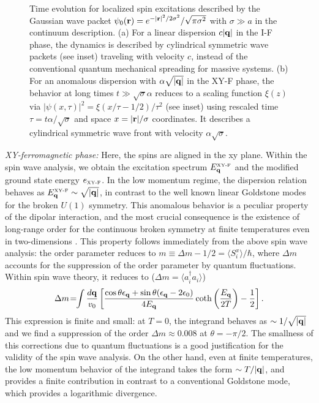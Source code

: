 \begin{figure}[ht]
  \caption{ Time evolution for localized spin excitations described by the Gaussian wave packet $\psi_{0}({\bf r}) = e^{- |{\bf r}|^2/2\sigma^2}/\sqrt{\pi \sigma^2}$
  with $\sigma \gg a$ in the continuum description. (a) For a linear dispersion $c|{\bf q}|$ in the I-F phase, the dynamics is described by cylindrical symmetric wave packets (see inset) traveling
  with velocity $c$, instead of the conventional quantum mechanical spreading for massive systems.
  (b)  For an anomalous dispersion with $\alpha \sqrt{|{\bf q}|}$ in the XY-F phase, the behavior at long times $t\gg\sqrt{\sigma} \alpha$ reduces to a
  scaling function $\xi(z)$  via   $|\psi(x,\tau)|^2 = \xi(x/\tau -1/2)/\tau^2$ (see inset) using rescaled
  time $\tau = t \alpha /\sqrt{\sigma}$ and space $x = |{\bf r}|/\sigma$ coordinates. It describes a cylindrical symmetric wave front with velocity
  $\alpha \sqrt{\sigma}$.}\label{fig3}
\end{figure}




 {\it XY-ferromagnetic phase:} Here, the spins are aligned in the xy plane.
 Within the spin wave analysis, we obtain the excitation spectrum
 $ E^{\mbox{\tiny{XY-F}}}_{\bf q}$ and the modified ground state energy
 $e_{\mbox{\tiny{XY-F}}}$.
  In the low momentum regime, the dispersion relation behaves as $ E^{\mbox{\tiny XY-F}}_{\bf q} \sim \sqrt{|{\bf q}|}$,   in contrast to the well
known  linear Goldstone modes for the broken $U(1)$ symmetry.
This anomalous behavior is a peculiar property of the dipolar interaction, and the most crucial consequence
is the existence of long-range order for the continuous broken symmetry at finite temperatures
even in two-dimensions \cite{bruno01}.
This property follows immediately from the above spin wave analysis:
the order parameter reduces to  $m \equiv \Delta m - 1/2=\langle S_{i}^{x}\rangle/\hbar $, where $\Delta m$  accounts for
the suppression of the order parameter by quantum fluctuations. Within spin wave theory, it reduces to ($\Delta m = \langle a^{\dag}_{i} a_{i }\rangle$)
%
\begin{displaymath}
\Delta m\! = \!\!  \int \frac{d{\bf q}}{v_{0}}\left[\frac{\cos \theta \epsilon_{\bf q} +\sin \theta ( \epsilon_{\bf q}-2 \epsilon_{0})}{4 E_{\bf q} } \coth \left(\frac{E_{\bf q}}{2T}\right) - \frac{1}{2}\right] .
\end{displaymath}
%
This expression is finite and small: at $T=0$, the integrand behaves as  $\sim 1/\sqrt{|{\bf q}|}$ and we find a
suppression of the order $\Delta m \approx 0.008$ at $\theta= - \pi/2 $. The smallness of this corrections due to
quantum fluctuations is a good justification for the validity of the spin wave analysis.  On the other hand,
even at finite temperatures, the low momentum behavior of the integrand takes the form $\sim T/|{\bf q}|$,
and provides a finite contribution in contrast to a conventional Goldstone mode, which provides a logarithmic divergence.


